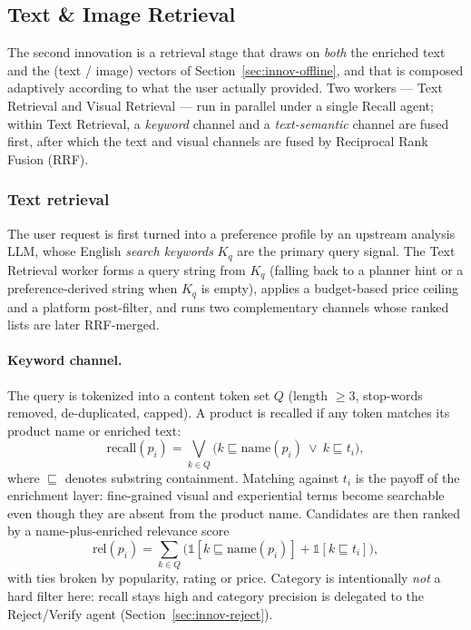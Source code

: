 \subsection{Text \& Image Retrieval}
\label{sec:innov-retrieval}

The second innovation is a retrieval stage that draws on \emph{both} the enriched
text and the (text / image) vectors of Section~\ref{sec:innov-offline}, and that is
composed adaptively according to what the user actually provided. Two workers ---
Text Retrieval and Visual Retrieval --- run in parallel under a single Recall
agent; within Text Retrieval, a \emph{keyword} channel and a \emph{text-semantic}
channel are fused first, after which the text and visual channels are fused by
Reciprocal Rank Fusion (RRF).

\subsubsection{Text retrieval}
\label{sec:text}

The user request is first turned into a preference profile by an upstream
analysis LLM, whose English \emph{search keywords} $K_q$ are the primary query
signal. The Text Retrieval worker forms a query string from $K_q$ (falling back
to a planner hint or a preference-derived string when $K_q$ is empty), applies a
budget-based price ceiling and a platform post-filter, and runs two
complementary channels whose ranked lists are later RRF-merged.

\paragraph{Keyword channel.}
The query is tokenized into a content token set $Q$ (length $\geq 3$, stop-words
removed, de-duplicated, capped). A product is recalled if any token matches its
product name or enriched text:
\begin{equation}
  \mathrm{recall}(p_i)=\bigvee_{k\in Q}
  \big(k \sqsubseteq \mathrm{name}(p_i)\ \lor\ k \sqsubseteq t_i\big),
  \label{eq:text-recall}
\end{equation}
where $\sqsubseteq$ denotes substring containment. Matching against $t_i$ is the
payoff of the enrichment layer: fine-grained visual and experiential terms become
searchable even though they are absent from the product name. Candidates are then
ranked by a name-plus-enriched relevance score
\begin{equation}
  \mathrm{rel}(p_i)=\sum_{k\in Q}\Big(
    \mathbb{1}\!\left[k\sqsubseteq\mathrm{name}(p_i)\right]
    +\mathbb{1}\!\left[k\sqsubseteq t_i\right]
  \Big),
  \label{eq:rel}
\end{equation}
with ties broken by popularity, rating or price. Category is intentionally
\emph{not} a hard filter here: recall stays high and category precision is
delegated to the Reject/Verify agent (Section~\ref{sec:innov-reject}).

